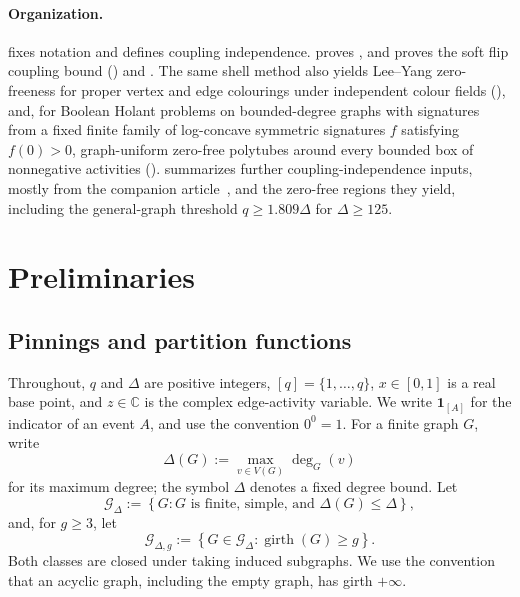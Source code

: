 \documentclass[11pt,reqno]{article}
\theoremstyle{plain}
\theoremstyle{definition}
\theoremstyle{remark}
\theoremstyle{definition}
\theoremstyle{remark}
\newcommand{\C}{\mathbb{C}}
\newcommand{\set}[1]{\left\{#1\right\}}
\newcommand{\one}[1]{\mathbf{1}_{\left[#1\right]}}   %
\newcommand{\Deg}{\Delta}                        %
\newcommand{\colours}{[q]}                        %
\newcommand{\Gdeg}{\mathcal{G}_{\Deg}}
\newcommand{\Gdegg}[1]{\mathcal{G}_{\Deg,#1}}
\begin{document}
\paragraph{Organization.}
 fixes notation and defines coupling independence.
 proves , and
 proves the soft flip coupling bound
() and .  The same shell
method also yields Lee--Yang zero-freeness for proper vertex and edge
colourings under independent colour fields (), and,
for Boolean Holant problems on bounded-degree graphs with signatures from
a fixed finite family of log-concave symmetric signatures \(f\)
satisfying \(f(0)>0\),
graph-uniform zero-free polytubes around every bounded box of
nonnegative activities ().
 summarizes further coupling-independence
inputs, mostly from the companion article~\cite{ShaoShi2026FurtherPotts},
and the zero-free regions they yield, including the general-graph threshold \(q\ge1.809\Deg\) for
\(\Deg\ge125\).


\section{Preliminaries}\label{sec:prelim}
%
\subsection{Pinnings and partition functions}\label{sec:potts-setup}

Throughout, \(q\) and \(\Deg\) are positive integers,
\(\colours=\{1,\ldots,q\}\), \(x\in[0,1]\) is a real base point, and
\(z\in\C\) is the complex edge-activity variable.  We write \(\one{A}\)
for the indicator of an event \(A\), and use the convention \(0^0=1\).
For a finite graph \(G\), write
\[
  \Delta(G):=\max_{v\in V(G)}\deg_G(v)
\]
for its maximum degree; the symbol \(\Deg\) denotes a fixed degree bound.
Let
\[
  \Gdeg:=\set{G:\text{$G$ is finite, simple, and }\Delta(G)\le\Deg},
\]
and, for \(g\ge3\), let
\[
  \Gdegg{g}:=\set{G\in\Gdeg:\operatorname{girth}(G)\ge g}.
\]
Both classes are closed under taking induced subgraphs.  We use the convention that
an acyclic graph, including the empty graph, has girth \(+\infty\).
\end{document}
